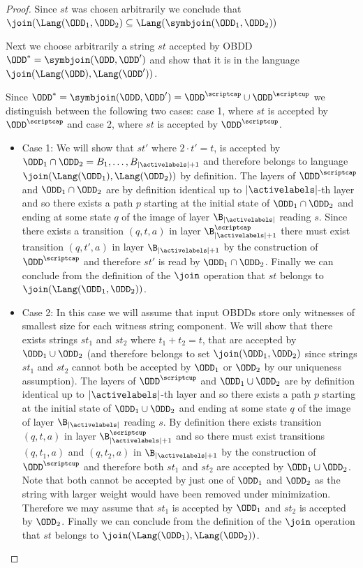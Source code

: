 \begin{proof}
    Since $st$ was chosen arbitrarily we conclude that $\join(\Lang(\ODD_1,\ODD_2)\subseteq\Lang(\symbjoin(\ODD_1,\ODD_2))  $

    Next we choose arbitrarily a string $st$ accepted by OBDD $\ODD^* = \symbjoin(\ODD,\ODD')$ and show that it is in the language $\join(\Lang(\ODD),\Lang(\ODD'))$.

    Since $\ODD^* = \symbjoin(\ODD,\ODD') = \ODD^{\scriptcap} \cup \ODD^{\scriptcup}$ we distinguish between the following two cases: case 1, where $st$ is accepted by $\ODD^\scriptcap$ and case 2, where $st$ is accepted by $\ODD^\scriptcup$.
    \begin{itemize}
        \item Case 1: We will show that $st'$ where $2 \cdot t' = t$, is accepted by $\ODD_1 \cap \ODD_2 = B_1,\ldots,B_{|\activelabels|+1}$ and therefore belongs to language $\join(\Lang(\ODD_1),\Lang(\ODD_2))$ by definition. The layers of $\ODD^\scriptcap$ and $\ODD_1 \cap \ODD_2$ are by definition identical up to $|\activelabels|$-th layer and so there exists a path $p$ starting at the initial state of $\ODD_1 \cap \ODD_2$ and ending at some state $q$ of the image of layer $\B_{|\activelabels|}$ reading $s$. Since there exists a transition $(q,t,a)$ in layer $\B_{|\activelabels|+1}^\scriptcap$ there must exist transition $(q,t',a)$ in layer $\B_{|\activelabels|+1}$ by the construction of $\ODD^\scriptcap$ and therefore $st'$ is read by $\ODD_1 \cap \ODD_2$. Finally we can conclude from the definition of the $\join$ operation that $st$ belongs to $\join(\Lang(\ODD_1,\ODD_2))$.
        
        
        \item Case 2: In this case we will assume that input OBDDs store only witnesses of smallest size for each witness string component. We will show that there exists strings $st_1$ and $st_2$ where $t_1 + t_2 = t$, that are accepted by $\ODD_1\cup \ODD_2$ (and therefore belongs to set $\join(\ODD_1,\ODD_2)$ since strings $st_1$ and $st_2$ cannot both be accepted by $\ODD_1$ or $\ODD_2$ by our uniqueness assumption). The layers of $\ODD^\scriptcup$ and $\ODD_1 \cup \ODD_2$ are by definition identical up to $|\activelabels|$-th layer and so there exists a path $p$ starting at the initial state of $\ODD_1 \cup \ODD_2$ and ending at some state $q$ of the image of layer $\B_{|\activelabels|}$ reading $s$. By definition there exists transition $(q,t,a)$ in layer $\B_{|\activelabels|+1}^\scriptcup$ and so there must exist transitions $(q,t_1,a)$ and $(q,t_2,a)$ in $\B_{|\activelabels|+1}$ by the construction of $\ODD^\scriptcup$ and therefore both $st_1$ and $st_2$ are accepted by $\ODD_1 \cup \ODD_2$. Note that both cannot be accepted by just one of $\ODD_1$ and $\ODD_2$ as the string with larger weight would have been removed under minimization. Therefore we may assume that $st_1$ is accepted by $\ODD_1$ and $st_2$ is accepted by $\ODD_2$. Finally we can conclude from the definition of the $\join$ operation that $st$ belongs to $\join(\Lang(\ODD_1),\Lang(\ODD_2))$. 
        

\end{itemize}
\end{proof}
